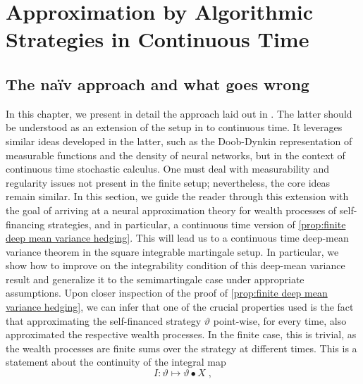 \documentclass[11pt]{report}
\theoremstyle{plain} %
\theoremstyle{definition} %
\theoremstyle{remark} %
\begin{document}
\chapter{Approximation by Algorithmic Strategies in Continuous Time}\label{ch:Approximation by Algorithmic Strategies in Continuous Time}
\section{The naïv approach and what goes wrong}\label{sec:The naïv approach and what goes wrong}
In this chapter, we present in detail the approach laid out in 
\parencite[Chapter~5]{Arandjelovic2025}. The latter should be understood as an extension of the setup in \parencite{Buehler2018DeepHedging} to continuous time. It leverages similar ideas developed in the latter, such as the Doob-Dynkin representation of measurable functions and the density of neural networks, but in the context of continuous time stochastic calculus. One must deal with measurability and regularity issues not present in the finite setup; nevertheless, the core ideas remain similar. In this section, we guide the reader through this extension with the goal of arriving at a neural approximation theory for wealth processes of self-financing strategies, and in particular, a continuous time version of \cref{prop:finite deep mean variance hedging}. This will lead us to a continuous time deep-mean variance theorem in the square integrable martingale setup. In particular, we show how to improve on the integrability condition of this deep-mean variance result \parencite[Thm.~5.32.]{Arandjelovic2025} and generalize it to the semimartingale case under appropriate assumptions. 
\bigbreak
Upon closer inspection of the proof of \cref{prop:finite deep mean variance hedging}, we can infer that one of the crucial properties used is the fact that approximating the self-financed strategy \(\vartheta\) point-wise, for every time, also approximated the respective wealth processes. In the finite case, this is trivial, as the wealth processes are finite sums over the strategy at different times. This is a statement about the continuity of the integral map
\begin{equation}\label{eq:stochastic integral map}
   I: \vartheta\mapsto \vartheta\bullet X\;,
\end{equation}
\end{document}
